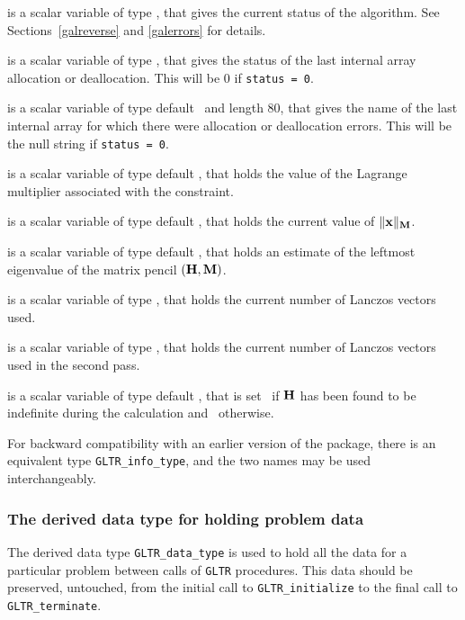 \documentclass{galahad}
\newcommand{\packagename}{GL\-TR}
\begin{document}
\begin{description}
 is a scalar variable of type \integer, that gives the
current status of the algorithm. See Sections~\ref{galreverse} and
\ref{galerrors} for details.

 is a scalar variable of type \integer,
that gives the status of the last internal array allocation
or deallocation. This will be 0 if {\tt status = 0}.

 is a scalar variable of type default \character\
and length 80, that  gives the name of the last internal array
for which there were allocation or deallocation errors.
This will be the null string if {\tt status = 0}.

 is a scalar variable of type default
\realdp, that holds the
value of the Lagrange multiplier associated with the constraint.

 is a scalar variable of type default
\realdp,
that holds the current
value of $\|{\mathbf{x}}\|_{{\mathbf{M}}} $.

 is a scalar variable of type default
\realdp, that holds an estimate of the leftmost eigenvalue of the
matrix pencil $({\mathbf{H}},{\mathbf{M}})$.

 is a scalar variable of type \integer, that holds the
current number of Lanczos vectors used.

 is a scalar variable of type \integer, that holds the
current number of Lanczos vectors used in the second pass.

 is a scalar variable of type default \logical, that
is set \true\ if ${\mathbf{H}}$ has been found to be indefinite during the calculation
and \false\ otherwise.
\end{description}

\noindent
For backward compatibility with an earlier version of the package, there
is an equivalent type {\tt \packagename\_info\_type}, and the two names
may be used interchangeably.


\subsubsection{The derived data type for holding problem data}\label{typedata}
The derived data type
{\tt \packagename\_data\_type}
is used to hold all the data for a particular problem between calls of
{\tt \packagename} procedures.
This data should be preserved, untouched, from the initial call to
{\tt \packagename\_initialize}
to the final call to
{\tt \packagename\_terminate}.
\end{document}
